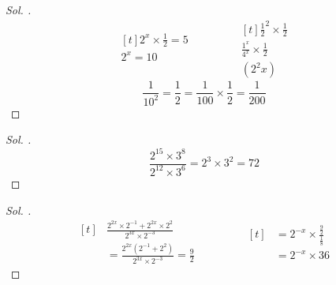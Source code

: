 \documentclass{article}
\theoremstyle{mytheoremstyle}
\theoremstyle{mytheoremstyle}
\theoremstyle{myproblemstyle}
\begin{document}
\begin{proof}[\textit{ Sol. }]
  \begin{equation*}
    \begin{aligned}[t]
      2^x \times \frac{1}{2} = 5\\
      2^x = 10\\
    \end{aligned}
    \qquad\qquad
    \begin{aligned}[t]
      \frac{1}{2}^2 \times \frac{1}{2}\\
      \frac{1^x}{4^x} \times \frac{1}{2}\\
      (2^2x)
    \end{aligned}
  \end{equation*}
  $$ \frac{1}{10^2} = \frac{1}{2} = \frac{1}{100} \times \frac{1}{2} = \frac{1}{200} $$
\end{proof}

\begin{problem}[$ \frac{8^5 \times 9^4}{2^12 \times 3^6} = ? $]
\end{problem}

\begin{proof}[\textit{ Sol. }]
  $$ \frac{2^{15} \times 3^8}{2^{12} \times 3^6} = 2^3 \times 3^2 = 72 $$
\end{proof}

\begin{problem}[$ \frac{2^{2x - 1} + 4^{x + 1}}{8^{x - 1}} = ? $]
\end{problem}

\begin{proof}[\textit{ Sol. }]
  \begin{equation*}
    \begin{aligned}[t]
      &\frac{2^{2x} \times 2^{-1} + 2^{2x} \times 2^2}{2^{3x} \times 2^{-3}}\\
      & = \frac{2^{2x}(2^{-1} +  2^2)}{2^{3x} \times 2^{-3}} = \frac{9}{2}
    \end{aligned}
    \qquad\qquad
    \begin{aligned}[t]
      &= 2^{-x} \times \frac{\frac{9}{2}}{\frac{1}{8}}\\
      &= 2^{-x} \times 36
    \end{aligned}
  \end{equation*}
\end{proof}

\begin{problem}[$ 2^x = 9 $, $ 3^y = 10 $, $ 5^z = 15 $ ise $ x, y, z $ sıralaması?]
\end{problem}
\end{document}
